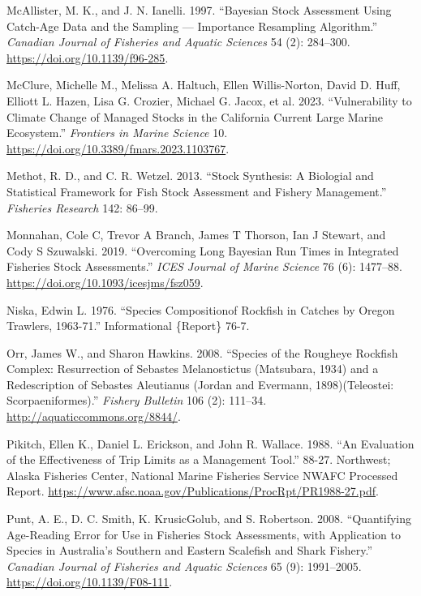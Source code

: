 \documentclass[
]{scrartcl}
\newlength{\cslhangindent}
\newenvironment{CSLReferences}[2] %
 {\begin{list}{}{%
  \setlength{\itemindent}{0pt}
  \setlength{\leftmargin}{0pt}
  \setlength{\parsep}{0pt}
  \ifodd #1
   \setlength{\leftmargin}{\cslhangindent}
   \setlength{\itemindent}{-1\cslhangindent}
  \fi
  \setlength{\itemsep}{#2\baselineskip}}}
 {\end{list}}
\begin{document}
\begin{CSLReferences}{1}{0}
McAllister, M. K., and J. N. Ianelli. 1997. {``Bayesian Stock Assessment
Using Catch-Age Data and the Sampling --- Importance Resampling
Algorithm.''} \emph{Canadian Journal of Fisheries and Aquatic Sciences}
54 (2): 284--300. \url{https://doi.org/10.1139/f96-285}.

McClure, Michelle M., Melissa A. Haltuch, Ellen Willis-Norton, David D.
Huff, Elliott L. Hazen, Lisa G. Crozier, Michael G. Jacox, et al. 2023.
{``Vulnerability to Climate Change of Managed Stocks in the {California
Current} Large Marine Ecosystem.''} \emph{Frontiers in Marine Science}
10. \url{https://doi.org/10.3389/fmars.2023.1103767}.

Methot, R. D., and C. R. Wetzel. 2013. {``Stock Synthesis: A Biologial
and Statistical Framework for Fish Stock Assessment and Fishery
Management.''} \emph{Fisheries Research} 142: 86--99.

Monnahan, Cole C, Trevor A Branch, James T Thorson, Ian J Stewart, and
Cody S Szuwalski. 2019. {``Overcoming Long Bayesian Run Times in
Integrated Fisheries Stock Assessments.''} \emph{{ICES} Journal of
Marine Science} 76 (6): 1477--88.
\url{https://doi.org/10.1093/icesjms/fsz059}.

Niska, Edwin L. 1976. {``Species {Compositionof} Rockfish in Catches by
{Oregon} {Trawlers}, 1963-71.''} Informational \{Report\} 76-7.

Orr, James W., and Sharon Hawkins. 2008. {``Species of the Rougheye
Rockfish Complex: Resurrection of {Sebastes} Melanostictus ({Matsubara},
1934) and a Redescription of {Sebastes} Aleutianus ({Jordan} and
{Evermann}, 1898)({Teleostei}: {Scorpaeniformes}).''} \emph{Fishery
Bulletin} 106 (2): 111--34. \url{http://aquaticcommons.org/8844/}.

Pikitch, Ellen K., Daniel L. Erickson, and John R. Wallace. 1988. {``An
Evaluation of the Effectiveness of Trip Limits as a Management Tool.''}
88-27. Northwest; Alaska Fisheries Center, National Marine Fisheries
Service NWAFC Processed Report.
\url{https://www.afsc.noaa.gov/Publications/ProcRpt/PR1988-27.pdf}.

Punt, A. E., D. C. Smith, K. KrusicGolub, and S. Robertson. 2008.
{``Quantifying Age-Reading Error for Use in Fisheries Stock Assessments,
with Application to Species in {A}ustralia's Southern and Eastern
Scalefish and Shark Fishery.''} \emph{Canadian Journal of Fisheries and
Aquatic Sciences} 65 (9): 1991--2005.
\url{https://doi.org/10.1139/F08-111}.


\end{CSLReferences}
\end{document}
